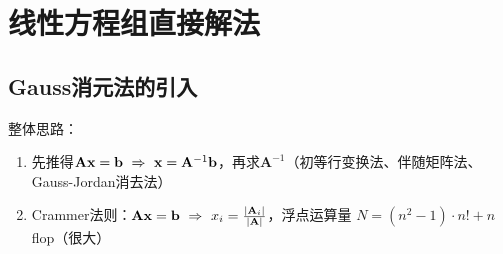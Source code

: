 \chapter{线性方程组直接解法}
\section{Gauss消元法的引入}

\entry 整体思路：
\begin{enumerate}\tl
    \item 先推得$\mathbf{Ax}=\mathbf{b}\ \Rightarrow\ \mathbf{x}=\mathbf{A}^{-1}\mathbf{b}$，再求$\mathbf{A}^{-1}$（初等行变换法、伴随矩阵法、Gauss-Jordan消去法）
    \item Crammer法则：$\mathbf{Ax}=\mathbf{b}\ \Rightarrow\  x_i=\frac{|\mathbf{A}_i|}{|\mathbf{A}|}$，浮点运算量 $N=(n^2-1)\cdot n!+n$ flop（很大）
\end{enumerate}

